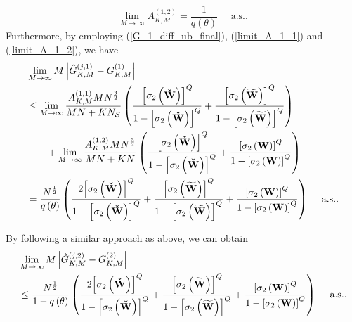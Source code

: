 \documentclass[11pt, draftclsnofoot, onecolumn]{IEEEtran}
\newcommand{\cW}{{\check{W}}}
\newcommand{\tW}{{\widetilde{W}}}
\begin{document}
\begin{IEEEproof}
\begin{equation}
\mathop {\lim }\limits_{M \to \infty } A_{K,M}^{(1,2)} = \frac{1}{{q\left( \theta  \right)}} \quad \text{ a.s.}.
\end{equation}
Furthermore, by employing (\ref{G_1_diff_ub_final}), (\ref{limit_A_1_1}) and (\ref{limit_A_1_2}), we have
\begin{align} \notag
& \mathop {\lim }\limits_{M \to \infty } M\left| {\hat G_{K,M}^{(j,1)} - G_{K,M}^{(1)}} \right| \\ \notag
& \le \mathop {\lim }\limits_{M \to \infty } \frac{{A_{K,M}^{(1,1)}M{N^{\frac{3}{2}}}}}{{MN + K{N_{\cal S}}}}\left( {\frac{{{{\left[ {{\sigma _2}\left( {\bf{\cW}} \right)} \right]}^Q}}}{{1 - {{\left[ {{\sigma _2}\left( {\bf{\cW}} \right)} \right]}^Q}}} + \frac{{{{\left[ {{\sigma _2}\left( {\bf{\tW}} \right)} \right]}^Q}}}{{1 - {{\left[ {{\sigma _2}\left( {\bf{\tW}} \right)} \right]}^Q}}}} \right) \\ \notag
& \qquad + \mathop {\lim }\limits_{M \to \infty } \frac{{A_{K,M}^{(1,2)}M{N^{\frac{3}{2}}}}}{{MN + KN}}\left( {\frac{{{{\left[ {{\sigma _2}\left( {\bf{\cW}} \right)} \right]}^Q}}}{{1 - {{\left[ {{\sigma _2}\left( {\bf{\cW}} \right)} \right]}^Q}}} + \frac{{{{\left[ {{\sigma _2}\left( {\bf{W}} \right)} \right]}^Q}}}{{1 - {{\left[ {{\sigma _2}\left( {\bf{W}} \right)} \right]}^Q}}}} \right)\\  \label{limit_G_diff_1}
& = \frac{{N^{\frac{1}{2}}}}{{q\left( \theta  \right)}}\left( {\frac{{2{{\left[ {{\sigma _2}\left( {\bf{\cW}} \right)} \right]}^Q}}}{{1 - {{\left[ {{\sigma _2}\left( {\bf{\cW}} \right)} \right]}^Q}}} + \frac{{{{\left[ {{\sigma _2}\left( {\bf{\tW}} \right)} \right]}^Q}}}{{1 - {{\left[ {{\sigma _2}\left( {\bf{\tW}} \right)} \right]}^Q}}} + \frac{{{{\left[ {{\sigma _2}\left( {\bf{W}} \right)} \right]}^Q}}}{{1 - {{\left[ {{\sigma _2}\left( {\bf{W}} \right)} \right]}^Q}}}} \right) \quad \text{ a.s.}.
\end{align}

By following a similar approach as above, we can obtain
\begin{align} \notag
& \mathop {\lim }\limits_{M \to \infty } M\left| {\hat G_{K,M}^{(j,2)} - G_{K,M}^{(2)}} \right|\\ \label{limit_G_diff_2}
& \le \frac{{N^{\frac{1}{2}}}}{1-{q\left( \theta  \right)}}\left( {\frac{{2{{\left[ {{\sigma _2}\left( {\bf{\cW}} \right)} \right]}^Q}}}{{1 - {{\left[ {{\sigma _2}\left( {\bf{\cW}} \right)} \right]}^Q}}} + \frac{{{{\left[ {{\sigma _2}\left( {\bf{\tW}} \right)} \right]}^Q}}}{{1 - {{\left[ {{\sigma _2}\left( {\bf{\tW}} \right)} \right]}^Q}}} + \frac{{{{\left[ {{\sigma _2}\left( {\bf{W}} \right)} \right]}^Q}}}{{1 - {{\left[ {{\sigma _2}\left( {\bf{W}} \right)} \right]}^Q}}}} \right) \quad \text{ a.s.}.
\end{align}


\end{IEEEproof}
\end{document}
